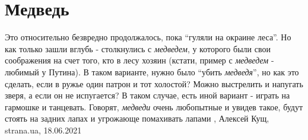  
 
 
 
 
\chapter{Медведь}
\label{sec:slova.medvedj}

Это относительно безвредно продолжалось, пока \enquote{гуляли на окраине леса}.
Но как только зашли вглубь - столкнулись с \emph{медведем}, у которого были
свои соображения на счет того, кто в лесу хозяин (кстати, пример с
\emph{медведем} - любимый у Путина).  В таком варианте, нужно было
\enquote{убить \emph{медведя}}, но как это сделать, если в ружье один патрон и
тот холостой?  Можно выстрелить и напугать зверя, а если он не испугается? В
таком случае, есть иной вариант - играть на гармошке и танцевать.  Говорят,
\emph{медведи} очень любопытные и увидев такое, будут стоять на задних лапах и
угрожающе помахивать лапами
, 
Алексей Кущ, strana.ua, 18.06.2021

